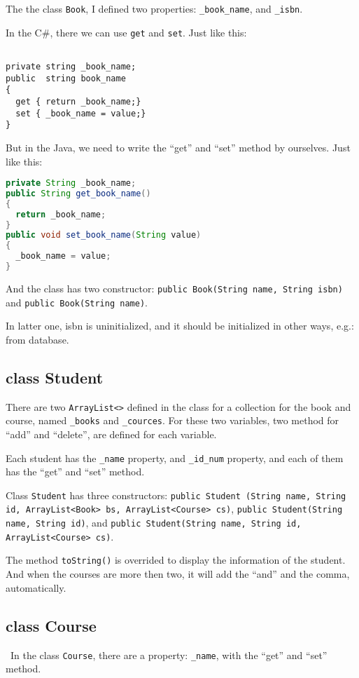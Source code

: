 \documentclass{ctexart}
\begin{document}
The the class \lstinline|Book|, I defined two properties: \lstinline|_book_name|, and \lstinline|_isbn|.

In the C\#, there we can use \lstinline|get| and \lstinline|set|. Just like this:
\begin{lstlisting}[language=C\#,caption=Get \& Set in C\#]

private string _book_name;
public  string book_name
{
  get { return _book_name;}
  set { _book_name = value;}
}
\end{lstlisting}

But in the Java, we need to write the ``get'' and ``set'' method by ourselves.
Just like this:
\begin{lstlisting}[language=Java,caption=Get \& Set in Java]
private String _book_name;
public String get_book_name()
{
  return _book_name;
}
public void set_book_name(String value)
{
  _book_name = value;
}
\end{lstlisting}

And the class has two constructor:
\lstinline|public Book(String name, String isbn)|
and
\lstinline|public Book(String name)|.

In latter one, isbn is uninitialized, and it should be initialized in other ways, e.g.: from database.

\subsection{class Student}

There are two \lstinline|ArrayList<>| defined in the class for a collection for the book and course, named \lstinline|_books| and \lstinline|_cources|.
For these two variables, two method for ``add'' and ``delete'', are defined for each variable.

Each student has the \lstinline|_name| property, and \lstinline|_id_num| property, and each of them has the ``get'' and ``set'' method.

Class \lstinline|Student| has three constructors:
 \lstinline|public Student (String name, String id, ArrayList<Book> bs, ArrayList<Course> cs)|,
\lstinline|public Student(String name, String id)|,
and \lstinline|public Student(String name, String id, ArrayList<Course> cs)|.

The method \lstinline|toString()| is overrided to display the information of the student. And when the courses are more then two, it will add the ``and'' and the comma, automatically.

\subsection{class Course}
\
In the class \lstinline|Course|, there are a property: \lstinline|_name|, with the ``get'' and ``set'' method.
\end{document}
